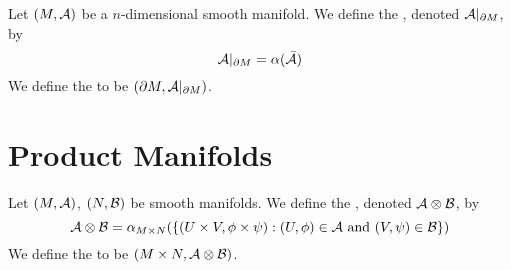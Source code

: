 \documentclass{book}
\begin{document}
\begin{defn}
	Let $(M, \mathcal{A})$ be a $n$-dimensional smooth manifold. We define the , denoted $\mathcal{A}|_{\partial M}$, by 
	$$\mathcal{A}|_{\partial M} = \alpha(\bar{\mathcal{A}})$$ 
	We define the  to be $(\partial M, \mathcal{A}|_{\partial M})$.
\end{defn}




































\newpage
\section{Product Manifolds}

\begin{defn}
	Let $(M, \mathcal{A})$, $(N, \mathcal{B})$ be smooth manifolds. We define the , denoted $\mathcal{A} \otimes \mathcal{B}$, by 
	$$\mathcal{A} \otimes \mathcal{B} = \alpha_{M \times N}(\{(U \times V, \phi \times \psi): (U, \phi) \in \mathcal{A} \text{ and } (V, \psi) \in \mathcal{B}\})$$ 
	We define the  to be $(M \times N, \mathcal{A} \otimes \mathcal{B})$.
\end{defn}

\begin{ex}
	
\end{ex}
\end{document}
